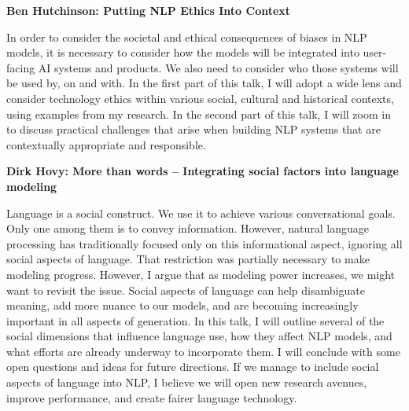\documentclass[a4paper,11pt,oneside]{book}
\begin{document}
\bigskip

\textbf{Ben Hutchinson: Putting NLP Ethics Into Context}

In order to consider the societal and ethical consequences of biases in NLP models, it is necessary to consider how the models will be integrated into user-facing AI systems and products. We also need to consider who those systems will be used by, on and with. In the first part of this talk, I will adopt a wide lens and consider technology ethics within various social, cultural and historical contexts, using examples from my research. In the second part of this talk, I will zoom in to discuss practical challenges that arise when building NLP systems that are contextually appropriate and responsible.

\bigskip

\textbf{Dirk Hovy: More than words – Integrating social factors into language modeling}

Language is a social construct. We use it to achieve various conversational goals. Only one among them is to convey information. However, natural language processing has traditionally focused only on this informational aspect, ignoring all social aspects of language. That restriction was partially necessary to make modeling progress. However, I argue that as modeling power increases, we might want to revisit the issue. Social aspects of language can help disambiguate meaning, add more nuance to our models, and are becoming increasingly important in all aspects of generation. In this talk, I will outline several of the social dimensions that influence language use, how they affect NLP models, and what efforts are already underway to incorporate them. I will conclude with some open questions and ideas for future directions. If we manage to include social aspects of language into NLP, I believe we will open new research avenues, improve performance, and create fairer language technology.


\clearpage



\clearpage

\setlength{\parskip}{0pt}

\renewcommand{\contentsname}{\mbox{}\\[-108pt]\noindent\textbf{\Large
    Table of Contents}\\[-28pt]}
\tableofcontents
\cleardoublepage
\end{document}
